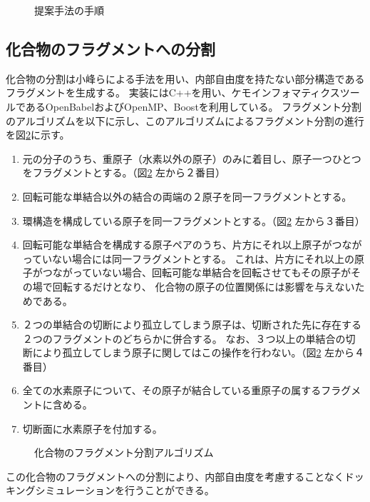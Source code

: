 \begin{figure}[p]
 \begin{center}
  \caption{提案手法の手順}
  \label{fig:workflow}
 \end{center}
\end{figure}

\subsection{化合物のフラグメントへの分割}\label{subsec:decomposition}
化合物の分割は小峰らによる手法\cite{Shunta2015}を用い、内部自由度を持たない部分構造であるフラグメントを生成する。
実装にはC++を用い、ケモインフォマティクスツールであるOpenBabel\cite{OBoyle2011}およびOpenMP、Boostを利用している。
フラグメント分割のアルゴリズムを以下に示し、このアルゴリズムによるフラグメント分割の進行を図\ref{fig:decomposition}に示す。
\begin{enumerate} 
\item 元の分子のうち、重原子（水素以外の原子）のみに着目し、原子一つひとつをフラグメントとする。（図\ref{fig:decomposition} 左から２番目）
\item 回転可能な単結合以外の結合の両端の２原子を同一フラグメントとする。
\item 環構造を構成している原子を同一フラグメントとする。（図\ref{fig:decomposition} 左から３番目）
\item 回転可能な単結合を構成する原子ペアのうち、片方にそれ以上原子がつながっていない場合には同一フラグメントとする。
	これは、片方にそれ以上の原子がつながっていない場合、回転可能な単結合を回転させてもその原子がその場で回転するだけとなり、
	化合物の原子の位置関係には影響を与えないためである。
\item ２つの単結合の切断により孤立してしまう原子は、切断された先に存在する２つのフラグメントのどちらかに併合する。
	なお、３つ以上の単結合の切断により孤立してしまう原子に関してはこの操作を行わない。（図\ref{fig:decomposition} 左から４番目）
\item 全ての水素原子について、その原子が結合している重原子の属するフラグメントに含める。
\item 切断面に水素原子を付加する。
\end{enumerate}
\begin{figure}[htp]
 \begin{center}
  \caption{化合物のフラグメント分割アルゴリズム\cite{Shunta2015}}
  \label{fig:decomposition}
 \end{center}
\end{figure}
この化合物のフラグメントへの分割により、内部自由度を考慮することなくドッキングシミュレーションを行うことができる。

